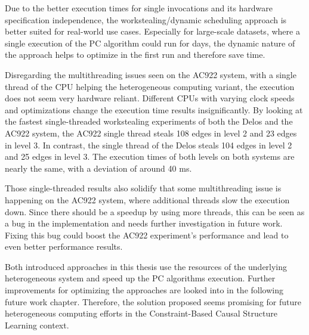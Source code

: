 Due to the better execution times for single invocations and its hardware specification independence, the workstealing/dynamic scheduling approach is better suited for real-world use cases. Especially for large-scale datasets, where a single execution of the PC algorithm could run for days, the dynamic nature of the approach helps to optimize in the first run and therefore save time.

Disregarding the multithreading issues seen on the AC922 system, with a single thread of the CPU helping the heterogeneous computing variant, the execution does not seem very hardware reliant. Different CPUs with varying clock speeds and optimizations change the execution time results insignificantly. By looking at the fastest single-threaded workstealing experiments of both the Delos and the AC922 system, the AC922 single thread steals 108 edges in level 2 and 23 edges in level 3. In contrast, the single thread of the Delos steals 104 edges in level 2 and 25 edges in level 3. The execution times of both levels on both systems are nearly the same, with a deviation of around 40 ms.

Those single-threaded results also solidify that some multithreading issue is happening on the AC922 system, where additional threads slow the execution down. Since there should be a speedup by using more threads, this can be seen as a bug in the implementation and needs further investigation in future work. Fixing this bug could boost the AC922 experiment's performance and lead to even better performance results.

Both introduced approaches in this thesis use the resources of the underlying heterogeneous system and speed up the PC algorithms execution. Further improvements for optimizing the approaches are looked into in the following future work chapter. Therefore, the solution proposed seems promising for future heterogeneous computing efforts in the Constraint-Based Causal Structure Learning context.
% 
% 
% 
% 
% 
% 